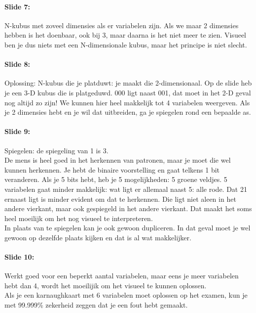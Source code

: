 \documentclass[10pt,a4paper]{book}
\begin{document}
\paragraph{Slide 7:} N-kubus met zoveel dimensies als er variabelen zijn. Als we maar 2 dimensies hebben is het doenbaar, ook bij 3, maar daarna is het niet meer te zien. Visueel ben je dus niets met een N-dimensionale kubus, maar het principe is niet slecht. 

\paragraph{Slide 8:} Oplossing: N-kubus die je platduwt: je maakt die 2-dimensionaal. Op de slide heb je een 3-D kubus die is platgeduwd. 000 ligt naast 001, dat moet in het 2-D geval nog altijd zo zijn! We kunnen hier heel makkelijk tot 4 variabelen weergeven. Als je 2 dimensies hebt en je wil dat uitbreiden, ga je spiegelen rond een bepaalde as.

\paragraph{Slide 9:} Spiegelen: de spiegeling van 1 is 3. \\
De mens is heel goed in het herkennen van patronen, maar je moet die wel kunnen herkennen. Je hebt de binaire voorstelling en gaat telkens 1 bit veranderen. Als je 5 bits hebt, heb je 5 mogelijkheden: 5 groene veldjes. 5 variabelen gaat minder makkelijk: wat ligt er allemaal naast 5: alle rode. Dat 21 ernaast ligt is minder evident om dat te herkennen. Die ligt niet aleen in het andere vierkant, maar ook gespiegeld in het andere vierkant. Dat maakt het soms heel moeilijk om het nog visueel te interpreteren.\\
In plaats van te spiegelen kan je ook gewoon dupliceren. In dat geval moet je wel gewoon op dezelfde plaats kijken en dat is al wat makkelijker. 

\paragraph{Slide 10:} Werkt goed voor een beperkt aantal variabelen, maar eens je meer variabelen hebt dan 4, wordt het moeilijik om het visueel te kunnen oplossen. \\
Als je een karnaughkaart met 6 variabelen moet oplossen op het examen, kun je met 99.999\% zekerheid zeggen dat je een fout hebt gemaakt.
\end{document}
